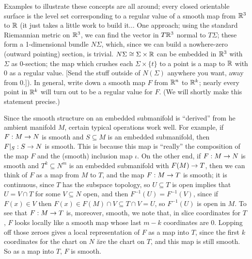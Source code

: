 Examples to illustrate these concepts are all around; every closed orientable surface is the
level set corresponding to a regular value of a smooth map from ${\Bbb R}^3$ to ${\Bbb R}$ (it just takes a 
little work to build it... One approach; using the standard
Riemannian metric on ${\Bbb R}^3$, we can find the vector in 
$T{\Bbb R}^3$ normal to $T\Sigma$; these form a 1-dimensional bundle $N\Sigma$, which, since
we can build a nowhere-zero (outward pointing) section, is trivial. 
$N\Sigma\cong \Sigma\times {\Bbb R}$ can be embedded in ${\Bbb R}^3$
with $\Sigma$ as $0$-section; the map which crushes each $\Sigma\times\{t\}$ to a point is a map 
to ${\Bbb R}$ with $0$ as a regular value. [Send the stuff outside of $N(\Sigma)$ anywhere
you want, away from $0$.]). In general, write down a smooth map $F$ from 
${\Bbb R}^n$ to ${\Bbb R}^k$; nearly 
every point in ${\Bbb R}^k$ will turn out to be a regular value for $F$. (We will shortly make this
statement precise.) 

\msk

Since the smooth structure on an embedded submanifold is ``derived'' from he ambient manifold $M$,
certain typical operations work well. For example, if $F:M\rightarrow N$ is smooth and
$S\subseteq M$ is an embedded submanifold, then $F|_S:S\rightarrow N$ is smooth. This is
because this map is ``really'' the composition of the map $F$ and the (smooth) inclusion map $\iota$.
On the other end, if 
$F:M\rightarrow N$ is smooth and $T^k\subseteq N^m$ is an embedded submanifold with $F(M)\rightarrow T$, then
we can think of $F$ as a map from $M$ to $T$, and the map $F:M\rightarrow T$ is smooth; it is
continuous, since $T$ has the subspace topology, so $U\subseteq T$ is open
implies that $U=V\cap T$ for some $V\subseteq N$ open,
and then $F^{-1}(U)=F^{-1}(V)$, since if $F(x)\in V$ then $F(x)\in F(M)\cap V\subseteq T\cap V=U$,
so $F^{-1}(U)$ is open in $M$. To see that $F:M\rightarrow T$ is, moreover, smooth, we note that,
in slice coordinates for $T$, $F$ looks locally like a smooth map whose last $m-k$ 
coordinates are $0$. Lopping off those zeroes gives a local representation of $F$ as a map
into $T$, since the first $k$ coordinates for the chart on $N$ \u{are} the chart on $T$,
and this map is still smooth. So as a map into $T$, $F$ is smooth.


